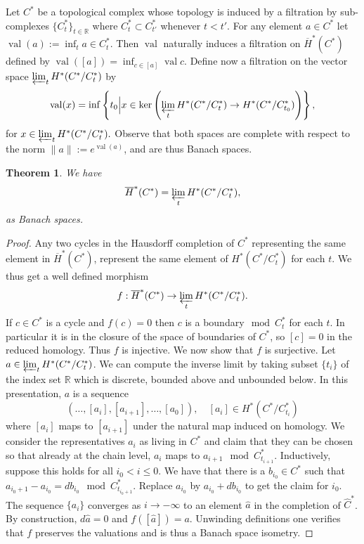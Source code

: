 \documentclass[11pt]{amsart}
\newcommand{\R}{\mathbb{R}}
\DeclareMathOperator{\val}{val}
\newtheorem{tm}{Theorem}[section]
\theoremstyle{definition}
\theoremstyle{remark}
\begin{document}
Let $C^*$ be a topological complex whose topology is induced by a filtration by sub-complexes $\{C^*_t\}_{t\in\R}$  where $C^*_t\subset C^*_{t'}$ whenever $t<t'$. For any element $a\in C^*$ let $\val(a):=\inf_ta\in C^*_t$. Then $\val$ naturally induces a filtration on $\overline{H}^*(C^*)$ defined by $\val([a])=\inf_{c\in[a]}\val c$. Define now a filtration on the vector space $\varprojlim_tH^*(C^*/C^*_t)$ by
\[
\val(x)=\inf\left\{t_0\Big|x\in\ker\left(\varprojlim_tH^*(C^*/C^*_t)\to H^*(C^*/C^*_{t_0})\right)\right\},
\]
for $x\in\varprojlim_tH^*(C^*/C^*_t).$ Observe that both spaces are complete with respect to the norm $\|a\|:=e^{\val(a)}$, and are thus Banach spaces.
\begin{tm}\label{lmReduceHomInv}
We have
\[
\overline{H}^*(C^*)=\varprojlim_tH^*(C^*/C^*_t),
\]
as Banach spaces. %
\end{tm}
\begin{proof}
Any two cycles in the Hausdorff completion of $C^*$ representing the same element in $\overline{H}^*(C^*)$, represent the same element of $H^*(C^*/C^*_t)$ for each $t$. We thus get a well defined morphism
\[
f:\overline{H}^*(C^*)\to\varprojlim_tH^*(C^*/C^*_t).
\]
If $c\in C^*$ is a cycle and $f(c)=0$ then $c$ is a boundary$\mod C^*_t$ for each $t$. In particular it is in the closure of the space of boundaries of $C^*$, so $[c]=0$ in the reduced homology. Thus $f$ is injective. We now show that $f$ is surjective. Let $a\in \varprojlim_tH^*(C^*/C^*_t)$. We can compute the inverse limit by taking subset $\{t_i\}$ of the index set $\R$ which is discrete, bounded above and unbounded below. In this presentation, $a$ is a sequence
\[
(\dots,[a_i],[a_{i+1}],\dots,[a_0]),\quad [a_i]\in H^*(C^*/C^*_{t_i})
\]
where $[a_i]$ maps to $[a_{i+1}]$ under the natural map induced on homology. We consider the representatives $a_i$ as living in $C^*$ and claim that  they can be chosen so that already at the chain level, $a_i$ maps to $a_{i+1}\mod C^*_{t_{i+1}}$. Inductively, suppose this holds for all $ i_0<i\leq 0$. We have that there is a $b_{i_0}\in C^*$ such that $a_{i_0+1}-a_{i_0}=db_{i_0}\mod C^*_{t_{i_0+1}}$. Replace $a_{i_0}$ by $a_{i_0}+db_{i_0}$ to get the claim for $i_0$. The sequence $\{a_i\}$ converges as $i\to-\infty$ to an element $\hat{a}$ in the completion of $\hat{C}^*$. By construction, $d\hat{a}=0$ and $f([\hat{a}])=a$. Unwinding definitions one verifies that $f$ preserves the valuations and is thus a Banach space isometry.
\end{proof}
\end{document}

